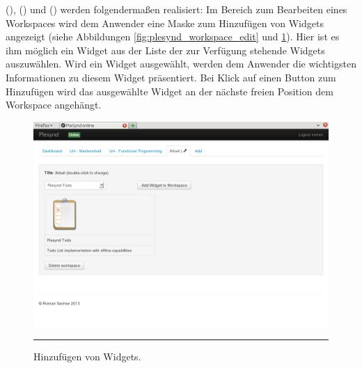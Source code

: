  (\emph{\requirementWidgetAdd}),  (\emph{\requirementWidgetFilterName}) und  (\emph{\requirementWidgetFilterOnline}) werden folgendermaßen realisiert: Im Bereich zum Bearbeiten eines Workspaces wird dem Anwender eine Maske zum Hinzufügen von Widgets angezeigt (siehe Abbildungen \ref{fig:plesynd_workspace_edit} und \ref{fig:plesynd_widget_add}). Hier ist es ihm möglich ein Widget aus der Liste der zur Verfügung stehende Widgets auszuwählen. Wird ein Widget ausgewählt, werden dem Anwender die wichtigsten Informationen zu diesem Widget präsentiert. Bei Klick auf einen Button zum Hinzufügen wird das ausgewählte Widget an der nächste freien Position dem Workspace angehängt. 
\begin{figure}[H]
  \centering
  \includegraphics[width=\textwidth]{./Figures/plesynd_widget_add.png}
    \rule{35em}{0.5pt}
  \caption[Plesynd User"=Interface: Hinzufügen von Widgets]{Hinzufügen von Widgets.}
  \label{fig:plesynd_widget_add}
\end{figure}
